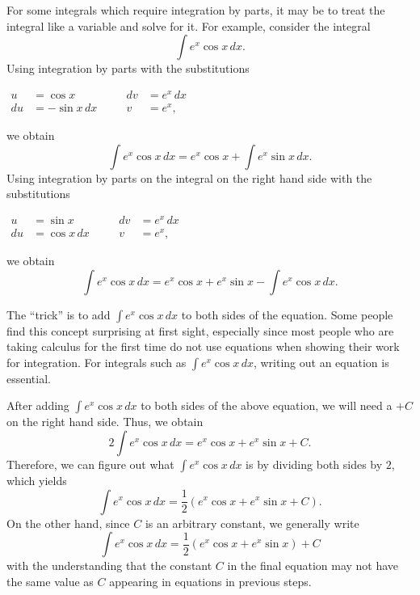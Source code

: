 \documentclass[12pt]{article}
\begin{document}

For some integrals which require integration by parts, it may be  to treat the integral like a variable and solve for it.  For example, consider the integral
\[
\int e^x\cos x\, dx.
\]
Using integration by parts with the substitutions
\begin{center}
$\begin{array}{rlcrl}
 u & = \cos x      & \quad & dv & =e^x\, dx \\
du & =-\sin x\, dx &       &  v & =e^x,
\end{array}$
\end{center}
we obtain
\[
\int e^x\cos x\, dx=e^x\cos x+\int e^x\sin x\, dx.
\]
Using integration by parts on the integral on the right hand side with the substitutions
\begin{center}
$\begin{array}{rlcrl}
 u & =\sin x      & \quad & dv & =e^x\, dx \\
du & =\cos x\, dx &       &  v & =e^x,
\end{array}$
\end{center}
we obtain
\[
\int e^x\cos x\, dx=e^x\cos x+e^x\sin x-\int e^x\cos x\, dx.
\]

The ``trick'' is to add $\int e^x\cos x\, dx$ to both sides of the equation.  Some people find this concept surprising at first sight, especially since most people who are taking calculus for the first time do not use equations when showing their work for integration.  For integrals such as $\int e^x\cos x\, dx$, writing out an equation is essential.

After adding $\int e^x\cos x\, dx$ to both sides of the above equation, we will need a $+C$ on the right hand side.  Thus, we obtain
\[
2\int e^x\cos x\, dx=e^x\cos x+e^x\sin x+C.
\]
Therefore, we can figure out what $\int e^x\cos x\, dx$ is by dividing both sides by $2$, which yields
\[
\int e^x\cos x\, dx=\frac{1}{2}\left( e^x\cos x+e^x\sin x+C \right).
\]
On the other hand, since $C$ is an arbitrary constant, we generally write
\[
\int e^x\cos x\, dx=\frac{1}{2}\left( e^x\cos x+e^x\sin x \right)+C
\]
with the understanding that the constant $C$ in the final equation may not have the same value as $C$ appearing in equations in previous steps.
\end{document}
